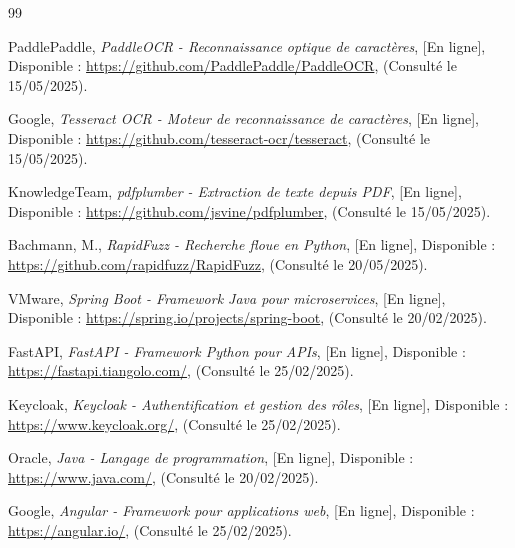 \documentclass[12pt,a4paper]{report}
\begin{document}
\begin{thebibliography}{99}

 PaddlePaddle, \textit{PaddleOCR - Reconnaissance optique de caractères}, [En ligne], Disponible : \url{https://github.com/PaddlePaddle/PaddleOCR}, (Consulté le 15/05/2025).

 Google, \textit{Tesseract OCR - Moteur de reconnaissance de caractères}, [En ligne], Disponible : \url{https://github.com/tesseract-ocr/tesseract}, (Consulté le 15/05/2025).

 KnowledgeTeam, \textit{pdfplumber - Extraction de texte depuis PDF}, [En ligne], Disponible : \url{https://github.com/jsvine/pdfplumber}, (Consulté le 15/05/2025).

 Bachmann, M., \textit{RapidFuzz - Recherche floue en Python}, [En ligne], Disponible : \url{https://github.com/rapidfuzz/RapidFuzz}, (Consulté le 20/05/2025).



 VMware, \textit{Spring Boot - Framework Java pour microservices}, [En ligne], Disponible : \url{https://spring.io/projects/spring-boot}, (Consulté le 20/02/2025).

 FastAPI, \textit{FastAPI - Framework Python pour APIs}, [En ligne], Disponible : \url{https://fastapi.tiangolo.com/}, (Consulté le 25/02/2025).

 Keycloak, \textit{Keycloak - Authentification et gestion des rôles}, [En ligne], Disponible : \url{https://www.keycloak.org/}, (Consulté le 25/02/2025).



 Oracle, \textit{Java - Langage de programmation}, [En ligne], Disponible : \url{https://www.java.com/}, (Consulté le 20/02/2025).



 Google, \textit{Angular - Framework pour applications web}, [En ligne], Disponible : \url{https://angular.io/}, (Consulté le 25/02/2025).


\end{thebibliography}
\end{document}

